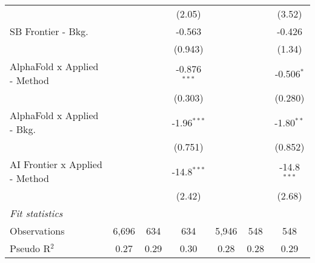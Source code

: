 \begin{tabular}{lcccccc}
                                  &                &               & (2.05)         &               &                & (3.52)\\   
   SB Frontier - Bkg.             &                &               & -0.563         &               &                & -0.426\\   
                                  &                &               & (0.943)        &               &                & (1.34)\\   
   AlphaFold x Applied - Method   &                &               & -0.876$^{***}$ &               &                & -0.506$^{*}$\\   
                                  &                &               & (0.303)        &               &                & (0.280)\\   
   AlphaFold x Applied - Bkg.     &                &               & -1.96$^{***}$  &               &                & -1.80$^{**}$\\   
                                  &                &               & (0.751)        &               &                & (0.852)\\   
   AI Frontier x Applied - Method &                &               & -14.8$^{***}$  &               &                & -14.8$^{***}$\\   
                                  &                &               & (2.42)         &               &                & (2.68)\\   
   \midrule
   \emph{Fit statistics}\\
   Observations                   & 6,696          & 634           & 634            & 5,946         & 548            & 548\\  
   Pseudo R$^2$                   & 0.27           & 0.29          & 0.30           & 0.28          & 0.28           & 0.29\\  
   

\end{tabular}
